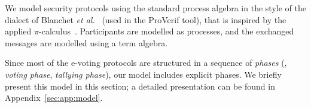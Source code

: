 

We model security protocols using the standard process algebra in the style of the
dialect of Blanchet \emph{et al.}~\cite{BlanchetAbadiFournetJLAP08}
(used in the ProVerif tool),
that is inspired by the applied $\pi$-calculus~\cite{AbadiFournet2001}.
Participants %
are modelled as processes, and the
exchanged messages are modelled using a term algebra.

Since most of the e-voting protocols are structured in a sequence of {\em phases}
(, {\em voting phase}, {\em tallying
phase}), our model includes explicit phases.
We briefly present this model in this section; a detailed presentation can be found
in Appendix~\ref{sec:app:model}.


